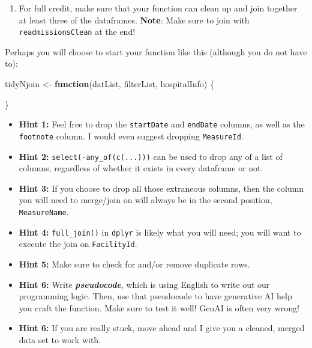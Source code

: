\documentclass[
]{article}
\newenvironment{Shaded}{\begin{snugshade}}{\end{snugshade}}
\newcommand{\ControlFlowTok}[1]{\textcolor[rgb]{0.13,0.29,0.53}{\textbf{#1}}}
\newcommand{\NormalTok}[1]{#1}
\newcommand{\OtherTok}[1]{\textcolor[rgb]{0.56,0.35,0.01}{#1}}
\providecommand{\tightlist}{%
  \setlength{\itemsep}{0pt}\setlength{\parskip}{0pt}}
\begin{document}
\begin{enumerate}
\def\labelenumi{\arabic{enumi}.}
\setcounter{enumi}{3}
\tightlist
\item
  For full credit, make sure that your function can clean up and join
  together at least three of the dataframes. \textbf{Note}: Make sure to
  join with \texttt{readmissionsClean} at the end!
\end{enumerate}

Perhaps you will choose to start your function like this (although you
do not have to):

\begin{Shaded}
\begin{Highlighting}[]
\NormalTok{tidyNjoin }\OtherTok{\textless{}{-}} \ControlFlowTok{function}\NormalTok{(datList, filterList, hospitalInfo) \{}

\NormalTok{\}}
\end{Highlighting}
\end{Shaded}

\begin{itemize}
\item
  \textbf{Hint 1: } Feel free to drop the \texttt{startDate} and
  \texttt{endDate} columns, as well as the \texttt{footnote} column. I
  would even suggest dropping \texttt{MeasureId}.
\item
  \textbf{Hint 2: } \texttt{select(-any\_of(c(...)))} can be used to
  drop any of a list of columns, regardless of whether it exists in
  every dataframe or not.
\item
  \textbf{Hint 3: } If you choose to drop all those extraneous columns,
  then the column you will need to merge/join on will always be in the
  second position, \texttt{MeasureName}.
\item
  \textbf{Hint 4: } \texttt{full\_join()} in \texttt{dplyr} is likely
  what you will need; you will want to execute the join on
  \texttt{FacilityId}.
\item
  \textbf{Hint 5: } Make sure to check for and/or remove duplicate rows.
\item
  \textbf{Hint 6: } Write \textbf{\emph{pseudocode}}, which is using
  English to write out our programming logic. Then, use that pseudocode
  to have generative AI help you craft the function. Make sure to test
  it well! GenAI is often very wrong!
\item
  \textbf{Hint 6: } If you are really stuck, move ahead and I give you a
  cleaned, merged data set to work with.
\end{itemize}
\end{document}
